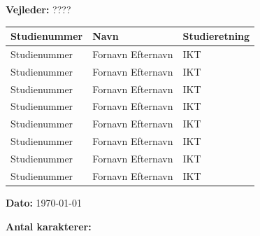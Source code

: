\begin{center}
	\textbf{Vejleder:} ????\\
	\vspace{5pt}
	\begin{tabular}{|l|l|l|}
		\hline
		\rowcolor{blue!25}
		\textbf{Studienummer} & \textbf{Navn} & \textbf{Studieretning} \\ [2pt]
		\hline
		Studienummer & Fornavn Efternavn & IKT \\
		\hline
		Studienummer & Fornavn Efternavn & IKT \\
		\hline
		Studienummer & Fornavn Efternavn & IKT \\
		\hline
		Studienummer & Fornavn Efternavn & IKT \\
		\hline
		Studienummer & Fornavn Efternavn & IKT \\
		\hline
		Studienummer & Fornavn Efternavn & IKT \\
		\hline
		Studienummer & Fornavn Efternavn & IKT \\
		\hline
		Studienummer & Fornavn Efternavn & IKT \\
		\hline
	\end{tabular}

	{\fontsize{10pt}{0}\selectfont
		\textbf{Dato: } \today\\
	}
	\vspace{5pt}
	
	\ifdefined\frontpageCharacters
		\textbf{Antal karakterer: } \frontpageCharacters\\
	\fi
	\vspace{30pt}

\end{center}
